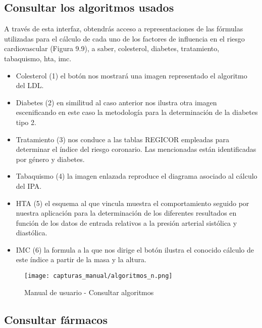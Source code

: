 \documentclass[11pt,spanish,
		listoftables,listoffigures]
		{tfgplantilla}
\begin{document}
\newpage
\subsection {Consultar los algoritmos usados}

A través de esta interfaz, obtendrás acceso a representaciones de las fórmulas utilizadas para el cálculo de cada uno de los factores de influencia en el riesgo cardiovascular (Figura 9.9), a saber, colesterol, diabetes, tratamiento, tabaquismo, hta, imc.

\begin{itemize}
	\item \textquotedbl Colesterol\textquotedbl{} (1) el botón nos mostrará una imagen representado el algoritmo del LDL.

	\item \textquotedbl Diabetes\textquotedbl{} (2) en similitud al caso anterior nos ilustra otra imagen escenificando en este caso la metodología para la determinación de la diabetes tipo 2.

	\item \textquotedbl Tratamiento\textquotedbl{} (3) nos conduce a las tablas REGICOR empleadas para determinar el índice del riesgo coronario. Las mencionadas están identificadas por género y diabetes.

	\item \textquotedbl Tabaquismo\textquotedbl{} (4) la imagen enlazada reproduce el diagrama asociado al cálculo del IPA.

	\item \textquotedbl HTA\textquotedbl{} (5) el esquema al que vincula muestra el comportamiento seguido por nuestra aplicación para la determinación de los diferentes resultados en función de los datos de entrada relativos a la presión arterial sistólica y diastólica.

	\item \textquotedbl IMC\textquotedbl{} (6) la formula a la que nos dirige el botón ilustra el conocido cálculo de este índice a partir de la masa y la altura.
\end{itemize}

\begin{figure}[H]
\centering
\texttt{[image: capturas\_manual/algoritmos\_n.png]}
\caption{Manual de usuario - Consultar algoritmos}
\end{figure}

\newpage
\subsection {Consultar fármacos}
\end{document}
